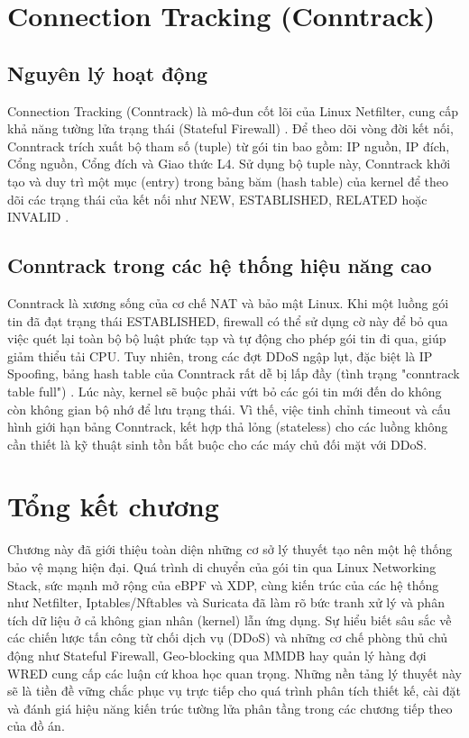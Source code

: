 \documentclass[../DoAn.tex]{subfiles}
\begin{document}
\section{Connection Tracking (Conntrack)}
\subsection{Nguyên lý hoạt động}
Connection Tracking (Conntrack) là mô-đun cốt lõi của Linux Netfilter, cung cấp khả năng tường lửa trạng thái (Stateful Firewall) \cite{ayuso2006netfilter}. Để theo dõi vòng đời kết nối, Conntrack trích xuất bộ tham số (tuple) từ gói tin bao gồm: IP nguồn, IP đích, Cổng nguồn, Cổng đích và Giao thức L4. Sử dụng bộ tuple này, Conntrack khởi tạo và duy trì một mục (entry) trong bảng băm (hash table) của kernel để theo dõi các trạng thái của kết nối như NEW, ESTABLISHED, RELATED hoặc INVALID \cite{ayuso2006netfilter, benvenuti2005linux}.

\subsection{Conntrack trong các hệ thống hiệu năng cao}
Conntrack là xương sống của cơ chế NAT và bảo mật Linux. Khi một luồng gói tin đã đạt trạng thái ESTABLISHED, firewall có thể sử dụng cờ này để bỏ qua việc quét lại toàn bộ bộ luật phức tạp và tự động cho phép gói tin đi qua, giúp giảm thiểu tải CPU. Tuy nhiên, trong các đợt DDoS ngập lụt, đặc biệt là IP Spoofing, bảng hash table của Conntrack rất dễ bị lấp đầy (tình trạng "conntrack table full") \cite{ayuso2006netfilter}. Lúc này, kernel sẽ buộc phải vứt bỏ các gói tin mới đến do không còn không gian bộ nhớ để lưu trạng thái. Vì thế, việc tinh chỉnh timeout và cấu hình giới hạn bảng Conntrack, kết hợp thả lỏng (stateless) cho các luồng không cần thiết là kỹ thuật sinh tồn bắt buộc cho các máy chủ đối mặt với DDoS.

\section{Tổng kết chương}
Chương này đã giới thiệu toàn diện những cơ sở lý thuyết tạo nên một hệ thống bảo vệ mạng hiện đại. Quá trình di chuyển của gói tin qua Linux Networking Stack, sức mạnh mở rộng của eBPF và XDP, cùng kiến trúc của các hệ thống như Netfilter, Iptables/Nftables và Suricata đã làm rõ bức tranh xử lý và phân tích dữ liệu ở cả không gian nhân (kernel) lẫn ứng dụng. Sự hiểu biết sâu sắc về các chiến lược tấn công từ chối dịch vụ (DDoS) và những cơ chế phòng thủ chủ động như Stateful Firewall, Geo-blocking qua MMDB hay quản lý hàng đợi WRED cung cấp các luận cứ khoa học quan trọng. Những nền tảng lý thuyết này sẽ là tiền đề vững chắc phục vụ trực tiếp cho quá trình phân tích thiết kế, cài đặt và đánh giá hiệu năng kiến trúc tường lửa phân tầng trong các chương tiếp theo của đồ án.
\end{document}
